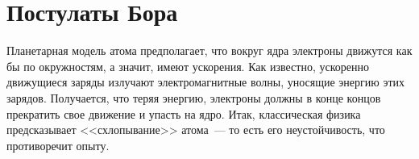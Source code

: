 \documentclass[main.tex]{subfiles}
\begin{document}

\pagestyle{empty}

 

\setcounter{section}{18
}
\addtocounter{section}{-1} 

\section{Постулаты Бора}



Планетарная модель атома предполагает, что вокруг ядра электроны движутся как бы по окружностям, а значит, имеют ускорения. Как известно, ускоренно движущиеся заряды излучают электромагнитные волны, уносящие энергию этих зарядов. Получается, что теряя энергию, электроны должны в конце концов прекратить свое движение и упасть на ядро. Итак, классическая физика предсказывает <<схлопывание>> атома~--- то есть его неустойчивость, что противоречит опыту. 
\end{document}
